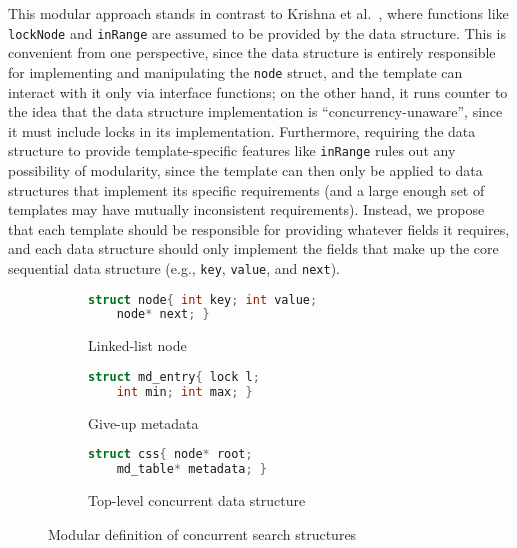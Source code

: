 \documentclass[sigplan,screen]{acmart}
\begin{document}
This modular approach stands in contrast to Krishna et al.~\cite{templates}, where functions like \lstinline{lockNode} and \lstinline{inRange} are assumed to be provided by the data structure. This is convenient from one perspective, since the data structure is entirely responsible for implementing and manipulating the \lstinline{node} struct, and the template can interact with it only via interface functions; on the other hand, it runs counter to the idea that the data structure implementation is ``concurrency-unaware'', since it must include locks in its implementation. Furthermore, requiring the data structure to provide template-specific features like \lstinline{inRange} rules out any possibility of modularity, since the template can then only be applied to data structures that implement its specific requirements (and a large enough set of templates may have mutually inconsistent requirements). Instead, we propose that each template should be responsible for providing whatever fields it requires, and each data structure should only implement the fields that make up the core sequential data structure (e.g., \lstinline{key}, \lstinline{value}, and \lstinline{next}).

\begin{figure}
  \begin{subfigure}[t]{.4\textwidth}
  \begin{lstlisting}[language=C, style=myStyle]
  struct node{ int key; int value;
    node* next; }
  \end{lstlisting}
    \caption{Linked-list node}
  \end{subfigure}
  \hfill
  \begin{subfigure}[t]{.4\textwidth}
  \begin{lstlisting}[language=C, style=myStyle]
  struct md_entry{ lock l;
    int min; int max; }
  \end{lstlisting}
    \caption{Give-up metadata}
  \end{subfigure}

  \medskip

  \begin{subfigure}[t]{.4\textwidth}
  \begin{lstlisting}[language=C, style=myStyle,numbers=none]
  struct css{ node* root;
    md_table* metadata; }
  \end{lstlisting}
    \caption{Top-level concurrent data structure}
  \end{subfigure}
  \caption{Modular definition of concurrent search structures}
  \label{node-md}
\end{figure}
\end{document}
